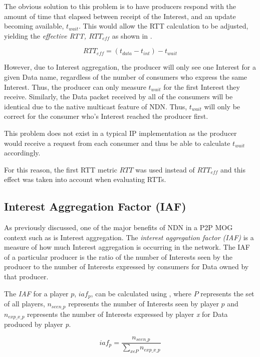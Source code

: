 The obvious solution to this problem is to have producers respond with the amount of time that elapsed between receipt of the Interest, and an update becoming available, $t_{wait}$. This would allow the RTT calculation to be adjusted, yielding the \textit{effective RTT, $RTT_{eff}$} as shown in .

\begin{equation}\label{eq:impl:rtt-eff}
    RTT_{eff} = (t_{data} - t_{int}) - t_{wait}
\end{equation}

However, due to Interest aggregation, the producer will only see one Interest for a given Data name, regardless of the number of consumers who express the same Interest. Thus, the producer can only measure $t_{wait}$ for the first Interest they receive. Similarly, the Data packet received by all of the consumers will be identical due to the native multicast feature of NDN. Thus, $t_{wait}$ will only be correct for the consumer who's Interest reached the producer first.

This problem does not exist in a typical IP implementation as the producer would receive a request from each consumer and thus be able to calculate $t_{wait}$ accordingly.

For this reason, the first RTT metric $RTT$ was used instead of $RTT_{eff}$ and this effect was taken into account when evaluating RTTs.


\subsection{Interest Aggregation Factor (IAF)}
As previously discussed, one of the major benefits of NDN in a P2P MOG context such as \game{} is Interest aggregation. The \textit{interest aggregation factor (IAF)} is a measure of how much Interest aggregation is occurring in the network. The IAF of a particular producer is the ratio of the number of Interests seen by the producer to the number of Interests expressed by consumers for Data owned by that producer.

The \textit{IAF} for a player $p$, $iaf_p$, can be calculated using , where $P$ represents the set of all players, $n_{seen\_p}$ represents the number of Interests seen by player $p$ and $n_{exp\_x\_p}$ represents the number of Interests expressed by player \textit{x} for Data produced by player \textit{p}.

\begin{equation}\label{eq:impl:iaf}
    iaf_p = \frac{n_{seen\_p}}{\sum\limits_{x \epsilon P}^{}{n_{exp\_x\_p}}}
\end{equation}


